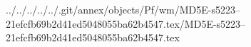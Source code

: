 ../../../../../.git/annex/objects/Pf/wm/MD5E-s5223--21efcfb69b2d41ed5048055ba62b4547.tex/MD5E-s5223--21efcfb69b2d41ed5048055ba62b4547.tex